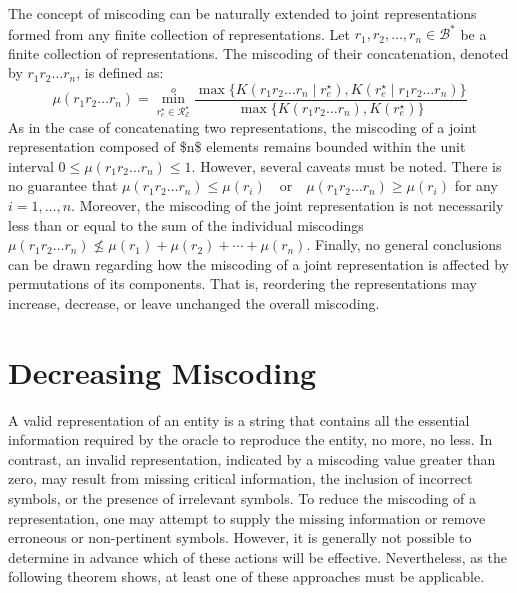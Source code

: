 The concept of miscoding can be naturally extended to joint representations formed from any finite collection of representations. Let $r_1, r_2, \ldots, r_n \in \mathcal{B}^\ast$ be a finite collection of representations. The miscoding of their concatenation, denoted by $r_1 r_2 \ldots r_n$, is defined as:
\[
\mu(r_1 r_2 \ldots r_n) = \overset{o}{ \underset{ r^\star_e \in \mathcal{R}^\star_\mathcal{E} } \min} \frac{ \max\{ K \left( r_1 r_2 \ldots r_n \mid r^\star_e \right), K \left( r^\star_e \mid r_1 r_2 \ldots r_n \right) \} } { \max\{ K \left( r_1 r_2 \ldots r_n \right), K \left( r^\star_e \right) \} }
\]
As in the case of concatenating two representations, the miscoding of a joint representation composed of \$n\$ elements remains bounded within the unit interval $0 \leq \mu(r_1 r_2 \ldots r_n) \leq 1$. However, several caveats must be noted. There is no guarantee that $\mu(r_1 r_2 \ldots r_n) \leq \mu(r_i) \quad \text{or} \quad \mu(r_1 r_2 \ldots r_n) \geq \mu(r_i)$ for any $i = 1, \ldots, n$. Moreover, the miscoding of the joint representation is not necessarily less than or equal to the sum of the individual miscodings $\mu(r_1 r_2 \ldots r_n) \nleq \mu(r_1) + \mu(r_2) + \cdots + \mu(r_n)$. Finally, no general conclusions can be drawn regarding how the miscoding of a joint representation is affected by permutations of its components. That is, reordering the representations may increase, decrease, or leave unchanged the overall miscoding.

%
%

\section{Decreasing Miscoding}

A valid representation of an entity is a string that contains all the essential information required by the oracle to reproduce the entity, no more, no less. In contrast, an invalid representation, indicated by a miscoding value greater than zero, may result from missing critical information, the inclusion of incorrect symbols, or the presence of irrelevant symbols. To reduce the miscoding of a representation, one may attempt to supply the missing information or remove erroneous or non-pertinent symbols. However, it is generally not possible to determine in advance which of these actions will be effective. Nevertheless, as the following theorem shows, at least one of these approaches must be applicable.

